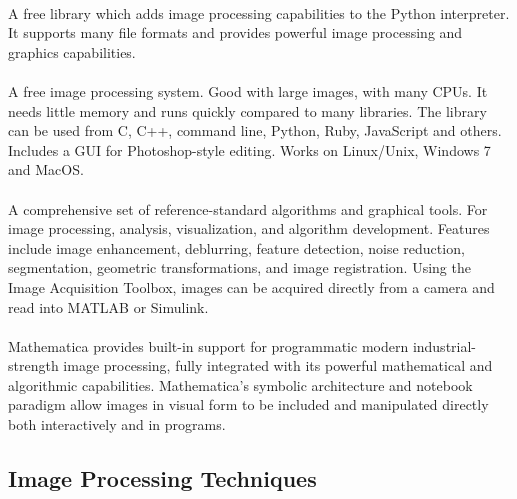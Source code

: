\documentclass{article}
\begin{document}
 \cite{pil} \\

\noindent A free library which adds image processing capabilities to the Python interpreter.  It supports many file formats and provides powerful image processing and graphics capabilities. \\

 \cite{vips} \\

\noindent A free image processing system.  Good with large images, with many CPUs.  It needs little memory and runs quickly compared to many libraries.  The library can be used from C, C++, command line, Python, Ruby, JavaScript and others.  Includes a GUI for Photoshop-style editing. Works on Linux/Unix, Windows 7 and MacOS. \\

 \cite{matlab_ipt} \\ 

\noindent A comprehensive set of reference-standard algorithms and graphical tools.  For image processing, analysis, visualization, and algorithm development.  Features include image enhancement, deblurring, feature detection, noise reduction, segmentation, geometric transformations, and image registration.  Using the Image Acquisition Toolbox, images can be acquired directly from a camera and read into MATLAB or Simulink. \cite{matlab_iat} \\ 


 \cite{mathematica} \\

\noindent Mathematica provides built-in support for programmatic modern industrial-strength image processing, fully integrated with its powerful mathematical and algorithmic capabilities.  Mathematica's symbolic architecture and notebook paradigm allow images in visual form to be included and manipulated directly both interactively and in programs.


	\subsection*{Image Processing Techniques}
\end{document}
